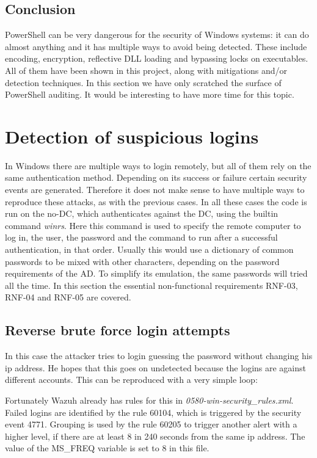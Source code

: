 \subsection{Conclusion}
PowerShell can be very dangerous for the security of Windows systems: it can do almost anything and it has multiple ways to avoid being detected.
These include encoding, encryption, reflective DLL loading and bypassing locks on executables.
All of them have been shown in this project, along with mitigations and/or detection techniques.
\linej
In this section we have only scratched the surface of PowerShell auditing. It would be interesting to have more time for this topic.

\section{Detection of suspicious logins}
In Windows there are multiple ways to login remotely, but all of them rely on the same authentication method. Depending on its success or failure certain security events are generated. Therefore it does not make sense to have multiple ways to reproduce these attacks, as with the previous cases.
\linej
In all these cases the code is run on the no-DC, which authenticates against the DC, using the builtin command \textit{winrs}\cite{winrs}. Here this command is used to specify the remote computer to log in, the user, the password and the command to run after a successful authentication, in that order.
\linej
\linej
Usually this would use a dictionary of common passwords to be mixed with other characters, depending on the password requirements of the AD.
To simplify its emulation, the same passwords will tried all the time.
\linej
\linej
In this section the essential non-functional requirements RNF-03, RNF-04 and RNF-05 are covered.

\subsection{Reverse brute force login attempts} \label{reverse_login}
In this case the attacker tries to login guessing the password without changing his ip address.
He hopes that this goes on undetected because the logins are against different accounts.
\linej
This can be reproduced with a very simple loop:

\linej
Fortunately Wazuh already has rules for this in \textit{0580-win-security\_rules.xml}\cite{wazuh_ruleset}.
Failed logins are identified by the rule 60104, which is triggered by the security event 4771\cite{windows_events}.
Grouping is used by the rule 60205 to trigger another alert with a higher level, if there are at least 8 in 240 seconds from the same ip address.
The value of the MS\_FREQ variable is set to 8 in this file.
\linej


